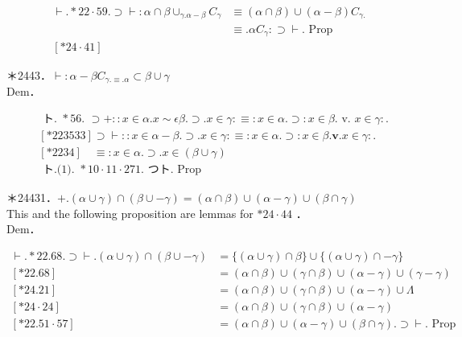 \documentclass[10pt]{article}
\begin{document}
$$
\begin{aligned}
\vdash . * 22 \cdot 59 . \supset \vdash: \alpha \cap \beta \cup_{\gamma . \alpha-\beta} C_{\gamma} & \equiv(\alpha \cap \beta) \cup(\alpha-\beta) C_{\gamma .} \\
& \equiv . \alpha C_{\gamma}: \supset \vdash . \text { Prop } \\
{[* 24 \cdot 41] } &
\end{aligned}
$$

＊2443．$\vdash: \alpha-\beta C_{\gamma . \equiv . \alpha} \subset \beta \cup \gamma$\\
Dem．


\begin{align*}
& \text { ト. } * 56 \text {. } \supset+:: x \in \alpha . x \sim \epsilon \beta . \supset . x \in \gamma: \equiv: x \in \alpha . \supset: x \in \beta . \text { v. } x \in \gamma: . \\
& {[* 223533] \supset \vdash:: x \in \alpha-\beta . \supset . x \in \gamma: \equiv: x \in \alpha . \supset: x \in \beta . \mathbf{v} . x \in \gamma: .} \\
& {[* 2234] \quad \equiv: x \in \alpha . \supset . x \in(\beta \cup \gamma)}  \tag{1}\\
& \text { ト.(1). } * 10 \cdot 11 \cdot 271 . \text { つト. Prop }
\end{align*}


＊24431．$+.(\alpha \cup \gamma) \cap(\beta \cup-\gamma)=(\alpha \cap \beta) \cup(\alpha-\gamma) \cup(\beta \cap \gamma)$\\
This and the following proposition are lemmas for $* 24 \cdot 44$ ．\\
Dem．

$$
\begin{array}{ll}
\vdash . * 22.68 . \supset \vdash .(\alpha \cup \gamma) \cap(\beta \cup-\gamma) & =\{(\alpha \cup \gamma) \cap \beta\} \cup\{(\alpha \cup \gamma) \cap-\gamma\} \\
{[* 22.68]} & =(\alpha \cap \beta) \cup(\gamma \cap \beta) \cup(\alpha-\gamma) \cup(\gamma-\gamma) \\
{[* 24.21]} & =(\alpha \cap \beta) \cup(\gamma \cap \beta) \cup(\alpha-\gamma) \cup \Lambda \\
{[* 24 \cdot 24]} & =(\alpha \cap \beta) \cup(\gamma \cap \beta) \cup(\alpha-\gamma) \\
{[* 22.51 \cdot 57]} & =(\alpha \cap \beta) \cup(\alpha-\gamma) \cup(\beta \cap \gamma) . \supset \vdash . \text { Prop }
\end{array}
$$
\end{document}
